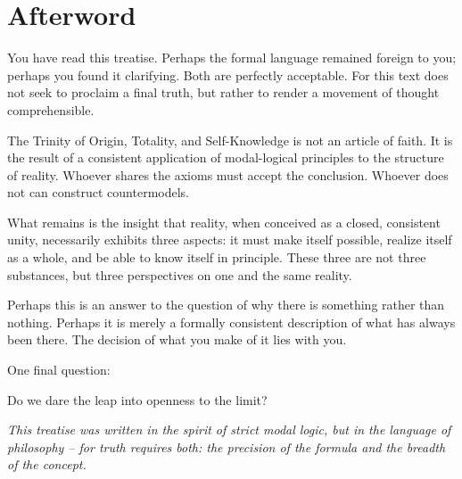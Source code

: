 \documentclass[
]{article}
\begin{document}
\section{Afterword}\label{afterword}

You have read this treatise. Perhaps the formal language remained foreign to you; perhaps you found it clarifying. Both are perfectly acceptable. For this text does not seek to proclaim a final truth, but rather to render a movement of thought comprehensible.

The Trinity of Origin, Totality, and Self-Knowledge is not an article of faith. It is the result of a consistent application of modal-logical principles to the structure of reality. Whoever shares the axioms must accept the conclusion. Whoever does not can construct countermodels.

What remains is the insight that reality, when conceived as a closed, consistent unity, necessarily exhibits three aspects: it must make itself possible, realize itself as a whole, and be able to know itself in principle. These three are not three substances, but three perspectives on one and the same reality.

Perhaps this is an answer to the question of why there is something rather than nothing. Perhaps it is merely a formally consistent description of what has always been there. The decision of what you make of it lies with you.

One final question:

Do we dare the leap into openness to the limit?

\begin{center}
\emph{This treatise was written in the spirit of strict modal logic, but in the language of philosophy -- for truth requires both: the precision of the formula and the breadth of the concept.}
\end{center}
\end{document}
